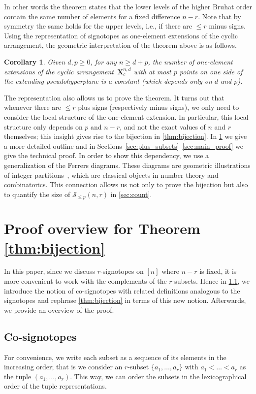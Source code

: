 \documentclass[a4paper,11pt]{amsart}
\newtheorem{corollary}[theorem]{Corollary}
\newcommand{\calS}{\mathcal{S}}
\begin{document}
In other words the theorem states that the lower levels of the higher Bruhat order contain the same number of elements for a fixed difference $n-r$.
Note that by symmetry the same holds for the upper levels, i.e., if there are $\leq r$ minus signs. 
Using the representation of signotopes as one-element extensions of the cyclic arrangement, the geometric interpretation of the theorem above is as follows.

\begin{corollary}
    Given $d,p \geq 0$, for any $n \geq d+p$, the number of one-element extensions of the cyclic arrangement~$\mathbf{X}^{n,d}_c$ with at most $p$ points on one side of the extending pseudohyperplane is a constant (which depends only on $d$ and $p$).
\end{corollary}

The representation also allows us to prove the theorem.
It turns out that whenever there are $\leq r$ plus signs (respectively minus signs), we only need to consider the local structure of the one-element extension. 
In particular, this local structure only depends on $p$ and $n-r$, and not the exact values of $n$ and $r$ themselves; this insight gives rise to the bijection in \cref{thm:bijection}.
In \cref{sec:proof_outline} we give a more detailed outline and in Sections~\ref{sec:plus_subsets}--\ref{sec:main_proof} we give the technical proof.
In order to show this dependency, we use a generalization of the Ferrers diagrams.
These diagrams are geometric illustrations of integer partitions~\cite{MR2122332}, which are classical objects in number theory and combinatorics.
This connection allows us not only to prove the bijection but also to quantify the size of $\calS_{\leq p}(n,r)$ in \cref{sec:count}.

\section{Proof overview for Theorem \ref{thm:bijection}}
\label{sec:proof_outline}
In this paper, since we discuss $r$-signotopes on $[n]$ where $n-r$ is fixed, it is more convenient to work with the complements of the $r$-subsets.
Hence in \cref{subsec:co}, we introduce the notion of co-signotopes with related definitions analogous to the signotopes and rephrase \cref{thm:bijection} in terms of this new notion.
Afterwards, we provide an overview of the proof.

\subsection{Co-signotopes}
\label{subsec:co}
For convenience, we write each subset as a sequence of its elements in the increasing order; that is we consider an $r$-subset $\{a_1, \dots, a_r\}$ with $a_1 < \dots < a_r$ as the tuple $(a_1, \dots, a_r)$.
This way, we can order the subsets in the lexicographical order of the tuple representations.
\end{document}

